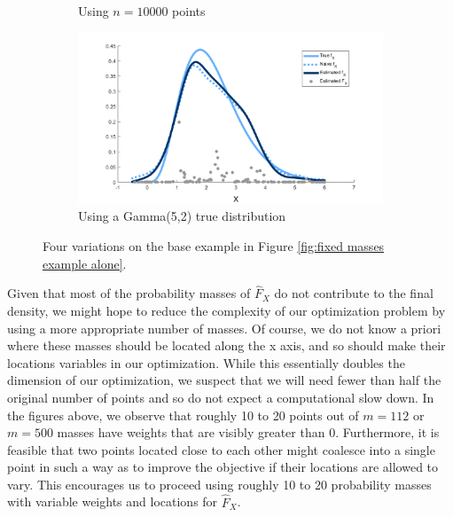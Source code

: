 \begin{figure}
\begin{subfigure}[b]{0.49\textwidth}
		\caption{Using $n = 10000$ points}
		\label{fig:fixed masses example n10000}
	\end{subfigure}
	\hfill
	\begin{subfigure}[b]{0.49\textwidth}
		\centering
		\includegraphics[width = \textwidth]{Figures/Deconvolution/fixed_masses_example_Xgamma.png}
		\caption{Using a Gamma(5,2) true distribution}
		\label{fig:fixed masses example Xgamma}
	\end{subfigure}
	\caption{Four variations on the base example in Figure \ref{fig:fixed masses example alone}.}
	\label{fig:comparison different fixed masses examples}
\end{figure}

Given that most of the probability masses of $\hat{F}_X$ do not contribute to the final density, we might hope to reduce the complexity of our optimization problem by using a more appropriate number of masses. Of course, we do not know a priori where these masses should be located along the x axis, and so should make their locations variables in our optimization. While this essentially doubles the dimension of our optimization, we suspect that we will need fewer than half the original number of points and so do not expect a computational slow down. In the figures above, we observe that roughly 10 to 20 points out of $m = 112$ or $m = 500$ masses have weights that are visibly greater than 0. Furthermore, it is feasible that two points located close to each other might coalesce into a single point in such a way as to improve the objective if their locations are allowed to vary. This encourages us to proceed using roughly 10 to 20 probability masses with variable weights and locations for $\hat{F}_X$.

